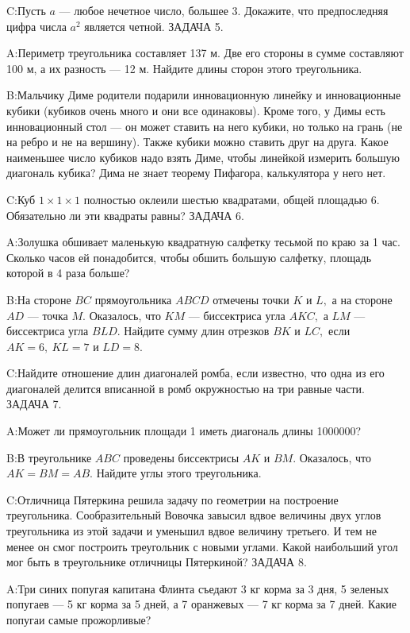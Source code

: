 \documentclass[10pt]{scrbook} \usepackage{modules/nonstahp_book}
\begin{document}
C:\qquad Пусть $a$ --- любое нечетное число, большее 3. Докажите, что предпоследняя цифра числа $a^2$ является четной.
\medbreak
\noindent
ЗАДАЧА 5.

A:\qquad Периметр треугольника составляет 137 м. Две его стороны в сумме составляют 100 м, а их разность --- 12 м. Найдите длины сторон этого треугольника.

B:\qquad Мальчику Диме родители подарили инновационную линейку и инновационные кубики (кубиков очень много и они все одинаковы). Кроме того, у Димы есть инновационный стол --- он может ставить на него кубики, но только на грань (не на ребро и не на вершину). Также кубики можно ставить друг на друга. Какое наименьшее число кубиков надо взять Диме, чтобы линейкой измерить большую диагональ кубика? Дима не знает теорему Пифагора, калькулятора у него нет.

C:\qquad Куб $1\times 1\times 1$ полностью оклеили шестью квадратами, общей площадью 6. Обязательно ли эти квадраты равны?
\medbreak
\noindent
ЗАДАЧА 6.

A:\qquad Золушка обшивает маленькую квадратную салфетку тесьмой по краю за 1 час. Сколько часов ей понадобится, чтобы обшить большую салфетку, площадь которой в 4 раза больше?

B:\qquad На стороне $BC$ прямоугольника $ABCD$ отмечены точки $K$ и $L,$ а на стороне $AD$ --- точка $M.$ Оказалось, что $KM$ --- биссектриса угла $AKC,$ а $LM$ --- биссектриса угла $BLD.$ Найдите сумму длин отрезков $BK$ и $LC,$ если $AK=6,\ KL=7$ и $LD=8.$

C:\qquad Найдите отношение длин диагоналей ромба, если известно, что одна из его диагоналей делится вписанной в ромб окружностью на три равные части.
\medbreak
\noindent
ЗАДАЧА 7.

A:\qquad Может ли прямоугольник площади 1 иметь диагональ длины 1000000?

B:\qquad  В треугольнике $ABC$ проведены биссектрисы $AK$ и $BM.$ Оказалось, что $AK=BM=AB.$ Найдите углы этого треугольника.

C:\qquad Отличница Пятеркина решила задачу по геометрии на построение треугольника. Сообразительный Вовочка завысил вдвое величины двух углов треугольника из этой задачи и уменьшил вдвое величину третьего. И тем не менее он смог построить треугольник с новыми углами. Какой наибольший угол мог быть в треугольнике отличницы Пятеркиной?
\medbreak
\noindent
ЗАДАЧА 8.

A:\qquad Три синих попугая капитана Флинта съедают 3 кг корма за 3 дня, 5 зеленых попугаев --- 5 кг корма за 5 дней, а 7 оранжевых --- 7 кг корма за 7 дней. Какие попугаи самые прожорливые?
\end{document}
